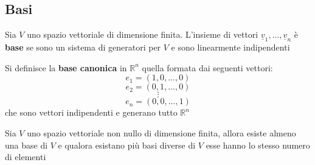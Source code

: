 \documentclass[a4paper,12pt, oneside]{book}
\begin{document}
\subsection{Basi}
\begin{definizione}
Sia $V$ uno spazio vettoriale di dimensione finita. L'insieme di vettori $\underline{v}_1,...,\underline{v}_n$ è \textbf{base} se sono un sistema di generatori per $V$ e sono linearmente indipendenti
\end{definizione}
\begin{nota}
Si definisce la \textbf{base canonica} in $\mathbb{R}^n$ quella formata dai seguenti vettori:
$$e_1=(1,0,...,0)$$
$$e_2=(0,1,...,0)$$
$$\vdots$$
$$e_n=(0,0,...,1)$$
che sono vettori indipendenti e generano tutto $\mathbb{R}^n$
\end{nota}
\newpage
\begin{teorema}
Sia $V$ uno spazio vettoriale non nullo di dimensione finita, allora esiste almeno una base di $V$ e qualora esistano più basi diverse di $V$ esse hanno lo stesso numero di elementi
\end{teorema}
\end{document}
